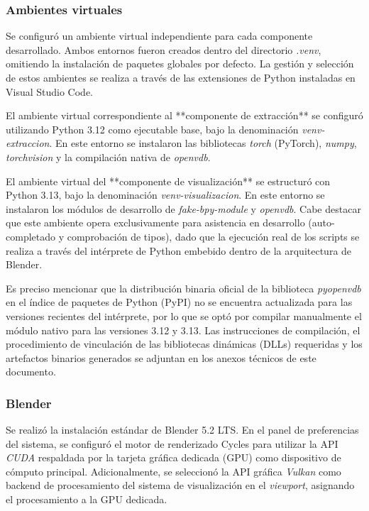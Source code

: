 \subsubsection{Ambientes virtuales}
Se configuró un ambiente virtual independiente para cada componente desarrollado. Ambos entornos fueron 
creados dentro del directorio \textit{.venv}, omitiendo la instalación de paquetes globales por defecto. 
La gestión y selección de estos ambientes se realiza a través de las extensiones de Python instaladas en
Visual Studio Code.
\medskip

El ambiente virtual correspondiente al **componente de extracción** se configuró utilizando Python 3.12 
como ejecutable base, bajo la denominación \textit{venv-extraccion}. En este entorno se instalaron las 
bibliotecas \textit{torch} (PyTorch), \textit{numpy}, \textit{torchvision} y la compilación nativa de \textit{openvdb}.
\medskip

El ambiente virtual del **componente de visualización** se estructuró con Python 3.13, bajo la denominación 
\textit{venv-visualizacion}. En este entorno se instalaron los módulos de desarrollo de 
\textit{fake-bpy-module} y \textit{openvdb}. Cabe destacar que este ambiente opera exclusivamente para asistencia en 
desarrollo (auto-completado y comprobación de tipos), dado que la ejecución real de los scripts se realiza 
a través del intérprete de Python embebido dentro de la arquitectura de Blender.
\medskip

Es preciso mencionar que la distribución binaria oficial de la biblioteca \textit{pyopenvdb} en el índice 
de paquetes de Python (PyPI) no se encuentra actualizada para las versiones recientes del intérprete, por 
lo que se optó por compilar manualmente el módulo nativo para las versiones 3.12 y 3.13. Las 
instrucciones de compilación, el procedimiento de vinculación de las bibliotecas dinámicas (DLLs) 
requeridas y los artefactos binarios generados se adjuntan en los anexos técnicos de este documento.

\subsubsection{Blender}
Se realizó la instalación estándar de Blender 5.2 LTS. En el panel de preferencias del sistema, 
se configuró el motor de renderizado Cycles para utilizar la API \textit{CUDA} respaldada por la tarjeta 
gráfica dedicada (GPU) como dispositivo de cómputo principal. Adicionalmente, se seleccionó la API gráfica 
\textit{Vulkan} como backend de procesamiento del sistema de visualización en el \textit{viewport}, 
asignando el procesamiento a la GPU dedicada.
\medskip

